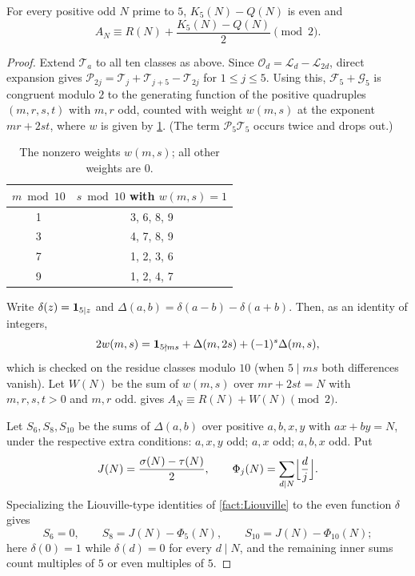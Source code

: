 \begin{proposition}\label{prop:K5-reduction}
For every positive odd $N$ prime to $5$, $K_5(N)-Q(N)$ is even and
\begin{equation}\label{eq:A-mod2}
  A_N\equiv R(N)+\frac{K_5(N)-Q(N)}2\pmod2 .
\end{equation}
\end{proposition}

\begin{proof}
Extend $\mathcal T_a$ to all ten classes as above. Since $\mathcal O_d=\mathcal L_d-\mathcal L_{2d}$,
direct expansion gives $\mathcal P_{2j}=\mathcal T_j+\mathcal T_{j+5}-\mathcal T_{2j}$ for
$1\le j\le5$. Using this, $\mathcal F_5+\mathcal G_5$ is congruent modulo $2$ to the
generating function of the positive quadruples $(m,r,s,t)$ with $m,r$ odd, counted
with weight $w(m,s)$ at the exponent $mr+2st$, where $w$ is given by
\cref{tab:weights}. (The term $\mathcal P_5\mathcal T_5$ occurs twice and drops out.)

\begin{table}[ht]
\caption{The nonzero weights $w(m,s)$; all other weights are $0$.}\label{tab:weights}
\begin{tabular}{cc}
\toprule
$m\bmod10$ & $s\bmod10$ with $w(m,s)=1$\\
\midrule
1 & 3, 6, 8, 9\\
3 & 4, 7, 8, 9\\
7 & 1, 2, 3, 6\\
9 & 1, 2, 4, 7\\
\bottomrule
\end{tabular}
\end{table}

Write $\delta(z)=\mathbf 1_{5\mid z}$ and $\Delta(a,b)=\delta(a-b)-\delta(a+b)$. Then, as an
identity of integers,
\[
  2w(m,s)=\mathbf 1_{5\nmid ms}+\Delta(m,2s)+(-1)^s\Delta(m,s),
\]
which is checked on the residue classes modulo $10$ (when $5\mid ms$ both differences
vanish). Let $W(N)$ be the sum of $w(m,s)$ over $mr+2st=N$ with $m,r,s,t>0$ and $m,r$
odd.  gives $A_N\equiv R(N)+W(N)\pmod2$.

Let $S_6,S_8,S_{10}$ be the sums of $\Delta(a,b)$ over positive $a,b,x,y$ with
$ax+by=N$, under the respective extra conditions: $a,x,y$ odd; $a,x$ odd; $a,b,x$
odd. Put
\[
  J(N)=\frac{\sigma(N)-\tau(N)}2,\qquad \Phi_j(N)=\sum_{d\mid N}\Bigl\lfloor\frac dj\Bigr\rfloor .
\]
Specializing the Liouville-type identities of \cref{fact:Liouville} to the even
function $\delta$ gives
\begin{equation}\label{eq:liouville}
  S_6=0,\qquad S_8=J(N)-\Phi_5(N),\qquad S_{10}=J(N)-\Phi_{10}(N);
\end{equation}
here $\delta(0)=1$ while $\delta(d)=0$ for every $d\mid N$, and the remaining inner
sums count multiples of $5$ or even multiples of $5$.


\end{proof}
